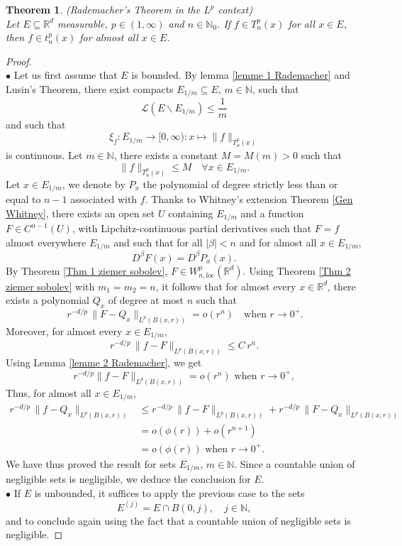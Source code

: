 \documentclass[a4paper,10pt]{article}
\theoremstyle{thmstyleone}%
\newtheorem{theorem}{Theorem}%
\theoremstyle{thmstyletwo}%
\theoremstyle{thmstylethree}%
\begin{document}
\begin{theorem}\label{Rademacher's Theorem Ziemer}\emph{(Rademacher's Theorem in the $L^p$ context)}
\\Let $E\subseteq \mathbb{R}^d$ measurable, $p\in(1,\infty)$ and $n\in\mathbb{N}_0$. If $f\in T^p_n(x)$ for all $x\in E$, then $f\in t^p_n(x)$ for almost all $x\in E$.
\end{theorem}
\begin{proof}~
\smallskip\\$\bullet$ Let us first assume that $E$ is bounded. By lemma \ref{lemme 1 Rademacher} and Lusin's Theorem, there exist compacts $E_{1/m}\subseteq E$, $m\in\mathbb{N}$, such that
\[\mathcal{L}\left(E\backslash E_{1/m}\right)\leq\frac{1}{m}\]
and such that \[\xi_f : E_{1/m} \rightarrow [0,\infty) : x\mapsto \|f\|_{T^p_\phi(x)}\] is continuous. Let $m\in\mathbb{N}$, there exists a constant $M=M(m)>0$ such that
 \[\|f\|_{T^p_n(x)}\leq M\quad\forall x\in E_{1/m}.\]
Let $x\in E_{1/m}$, we denote by $P_x$ the polynomial of degree strictly less than or equal to $n-1$ associated with $f$. Thanks to Whitney's extension Theorem \ref{Gen Whitney}, there exists an open set $U$ containing $E_{1/m}$ and a function $F\in C^{n-1}(U)$, with Lipchitz-continuous partial derivatives such that $F=f$ almost everywhere $E_{1/m}$ and such that for all $|\beta|< n$ and for almost all $x\in E_{1/m}$,
\[D^\beta F(x)=D^\beta P_x(x).\]
By Theorem \ref{Thm 1 ziemer sobolev}, $F\in W^p_{n,\text{loc}}(\mathbb{R}^d)$. Using Theorem \ref{Thm 2 ziemer sobolev} with $m_1=m_2=n$, it follows that for almost every $x\in \mathbb{R}^d$, there exists a polynomial $Q_x$ of degree at most $n$ such that
\[\,r^{-d/p}\,\|F-Q_x\|_{L^p(B(x,r))}= o(r^{n})\quad \text{when } r\rightarrow 0^+.\]
Moreover, for almost every $x\in E_{1/m}$,  
\[r^{-d/p}\,\|f-F\|_{L^p(B(x,r))}\leq C\,r^n.\]
Using Lemma \ref{lemme 2 Rademacher}, we get
\[r^{-d/p}\|f-F\|_{L^p(B(x,r))}= o(r^n)\text{ when } r\rightarrow 0^+,\]
Thus, for almost all $x\in E_{1/m}$, 
\begin{align*}
r^{-d/p}\,\|f-Q_x\|_{L^p(B(x,r))}&\leq r^{-d/p}\,\|f-F\|_{L^p(B(x,r))}+r^{-d/p}\,\|F-Q_x\|_{L^p(B(x,r))}\\
&= o(\phi(r)) + o(r^{n+1})\\&= o(\phi(r))\text{ when } r\rightarrow 0^+.
\end{align*}
We have thus proved the result for sets $E_{1/m}$, $m\in\mathbb{N}$. Since a countable union of negligible sets is negligible, we deduce the conclusion for $E$.
\smallskip\\$\bullet$ If $E$ is unbounded, it suffices to apply the previous case to the sets
\[
E^{(j)} = E \cap B(0,j), \quad j \in \mathbb{N},
\]
and to conclude again using the fact that a countable union of negligible sets is negligible.
\end{proof}
\end{document}
